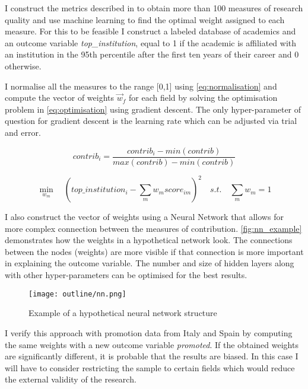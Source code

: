 \documentclass[10pt]{report}
\begin{document}
I construct the metrics described in \textcite{Waltman2016} to obtain more than 100 measures of research quality and use machine learning to find the optimal weight assigned to each measure. For this to be feasible I construct a labeled database of academics and an outcome variable \textit{top\_institution}, equal to 1 if the academic is affiliated with an institution in the 95th percentile after the first ten years of their career and 0 otherwise.

I normalise all the measures to the range [0,1] using \autoref{eq:normalisation} and compute the vector of weights \(\vec{w}_f\) for each field by solving the optimisation problem in \autoref{eq:optimisation} using gradient descent. The only hyper-parameter of question for gradient descent is the learning rate which can be adjusted via trial and error.

\begin{equation}
    \label{eq:normalisation}
    contrib_i = \frac{contrib_i - min(contrib)}{max(contrib) - min(contrib)}
\end{equation}

\begin{equation}
    \label{eq:optimisation}
    \min_{w_m} \quad (top\_institution_i - \sum_m w_m score_{im})^2 \quad s.t. \quad \sum_{m} w_m = 1
\end{equation}

I also construct the vector of weights using a Neural Network that allows for more complex connection between the measures of contribution. \autoref{fig:nn_example} demonstrates how the weights in a hypothetical network look. The connections between the nodes (weights) are more visible if that connection is more important in explaining the outcome variable. The number and size of hidden layers along with other hyper-parameters can be optimised for the best results.


\begin{figure}[htbp]
    \centering
    \texttt{[image: outline/nn.png]}
    \caption{Example of a hypothetical neural network structure}
    \label{fig:nn_example}
\end{figure}


I verify this approach with promotion data from Italy and Spain \parencite[]{Bagues2017} by computing the same weights with a new outcome variable \textit{promoted}. If the obtained weights are significantly different, it is probable that the results are biased. In this case I will have to consider restricting the sample to certain fields which would reduce the external validity of the research.
\end{document}
